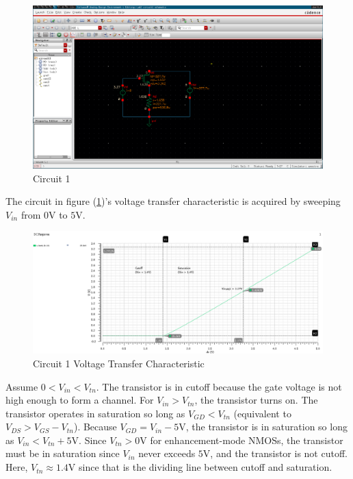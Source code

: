 
\FloatBarrier

\begin{figure}[h!]
	\centering
	\includegraphics[scale=0.45]{../images/circuit1.PNG}
	\caption{Circuit 1}
	\label{fig:circuit1}
\end{figure}

\FloatBarrier

The circuit in figure (\ref{fig:circuit1})'s voltage transfer characteristic is acquired by sweeping $V_{in}$ from $0$\si{\volt} to $5$\si{\volt}.

\FloatBarrier

\begin{figure}[h!]
	\centering
	\includegraphics[scale=0.45]{../images/sim1_vtc.PNG}
	\caption{Circuit 1 Voltage Transfer Characteristic}
	\label{fig:sim1_vtc}
\end{figure}

\FloatBarrier
Assume $0 < V_{in} < V_{tn}$.
The transistor is in cutoff because the gate voltage is not high enough to form a channel.
For $V_{in} > V_{tn}$, the transistor turns on.
The transistor operates in saturation so long as $V_{GD} < V_{tn}$ (equivalent to $V_{DS} > V_{GS} - V_{tn}$).
Because $V_{GD} = V_{in} - 5$\si{\volt}, the transistor is in saturation so long as $V_{in} < V_{tn} + 5$\si{\volt}.
Since $V_{tn} > 0$\si{\volt} for enhancement-mode NMOSs, the transistor must be in saturation since $V_{in}$ never exceeds $5$\si{\volt}, and the transistor is not cutoff.
Here, $V_{tn} \approx 1.4$\si{\volt} since that is the dividing line between cutoff and saturation. \\

